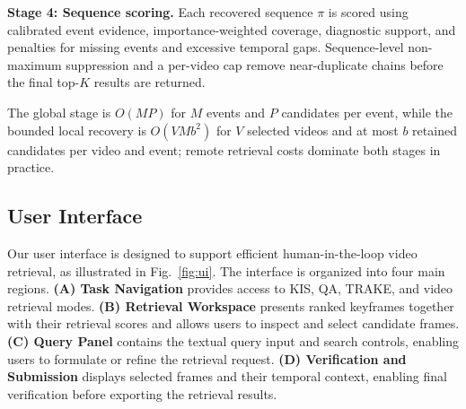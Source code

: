 \documentclass[runningheads]{llncs}
\begin{document}
\textbf{Stage 4: Sequence scoring.}
Each recovered sequence $\pi$ is scored using calibrated event evidence,
importance-weighted coverage, diagnostic support, and penalties for missing
events and excessive temporal gaps. Sequence-level non-maximum suppression and
a per-video cap remove near-duplicate chains before the final top-$K$ results
are returned.

The global stage is $O(MP)$ for $M$ events and $P$ candidates per event, while
the bounded local recovery is $O(VMb^2)$ for $V$ selected videos and at most
$b$ retained candidates per video and event; remote retrieval costs dominate
both stages in practice.

\begin{algorithm}[t]
\caption{Diagnostic-Event Video-First Search (DEV)}
\label{alg:dev}
\end{algorithm}

\subsection{User Interface}
\label{sec:ui}

Our user interface is designed to support efficient human-in-the-loop
video retrieval, as illustrated in Fig.~\ref{fig:ui}. The interface is
organized into four main regions. \textbf{(A) Task Navigation} provides
access to KIS, QA, TRAKE, and video retrieval modes.
\textbf{(B) Retrieval Workspace} presents ranked keyframes together with
their retrieval scores and allows users to inspect and select candidate
frames. \textbf{(C) Query Panel} contains the textual query input and
search controls, enabling users to formulate or refine the retrieval
request. \textbf{(D) Verification and Submission} displays selected
frames and their temporal context, enabling final verification before
exporting the retrieval results.
\end{document}
